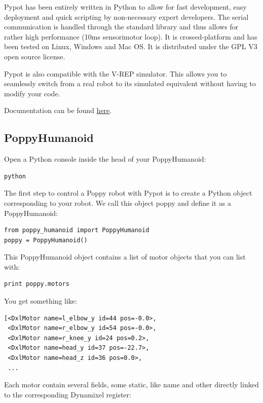 \documentclass{article}
\begin{document}
Pypot has been entirely written in Python to allow for fast development, easy deployment and quick scripting by non-necessary expert developers. The serial communication is handled through the standard library and thus allows for rather high performance (10ms sensorimotor loop). It is crossed-platform and has been tested on Linux, Windows and Mac OS. It is distributed under the GPL V3 open source license.

Pypot is also compatible with the V-REP simulator. This allows you to seamlessly switch from a real robot to its simulated equivalent without having to modify your code.

Documentation can be found \href{http://poppy-project.github.io/pypot/index.html}{here}. %

\subsection{PoppyHumanoid}

Open a Python console inside the head of your PoppyHumanoid:

\begin{verbatim}
python
\end{verbatim}

The first step to control a Poppy robot with Pypot is to create a Python object corresponding to your robot. We call this object poppy and define it as a PoppyHumanoid:

\begin{verbatim}
from poppy_humanoid import PoppyHumanoid
poppy = PoppyHumanoid()
\end{verbatim}

This PoppyHumanoid object contains a list of motor objects that you can list with:

\begin{verbatim}
print poppy.motors
\end{verbatim}

You get something like:

\begin{verbatim}
[<DxlMotor name=l_elbow_y id=44 pos=-0.0>,
 <DxlMotor name=r_elbow_y id=54 pos=-0.0>,
 <DxlMotor name=r_knee_y id=24 pos=0.2>,
 <DxlMotor name=head_y id=37 pos=-22.7>,
 <DxlMotor name=head_z id=36 pos=0.0>,
 ...
\end{verbatim}

Each motor contain several fields, some static, like name and other directly linked to the corresponding Dynamixel register:
\end{document}

